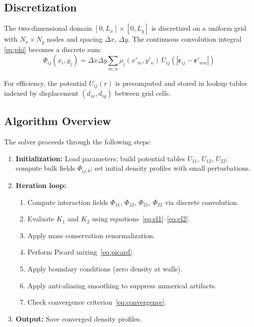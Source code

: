 \documentclass[conference]{IEEEtran}
\begin{document}
\subsection{Discretization}

The two-dimensional domain $[0, L_x] \times [0, L_y]$ is discretized on a uniform grid with $N_x \times N_y$ nodes and spacing $\Delta x$, $\Delta y$. The continuous convolution integral \eqref{eq:phi} becomes a discrete sum:
\begin{equation}
\Phi_{ij}(x_i, y_j) = \Delta x \Delta y \sum_{m,n} \rho_j(x'_m, y'_n) \, U_{ij}(|\mathbf{r}_{ij} - \mathbf{r}'_{mn}|)
\label{eq:discrete_phi}
\end{equation}

For efficiency, the potential $U_{ij}(r)$ is precomputed and stored in lookup tables indexed by displacement $(d_{ix}, d_{iy})$ between grid cells.

\subsection{Algorithm Overview}

The solver proceeds through the following steps:
\begin{enumerate}
    \item \textbf{Initialization:} Load parameters; build potential tables $U_{11}$, $U_{12}$, $U_{22}$; compute bulk fields $\Phi_{ij,b}$; set initial density profiles with small perturbations.
    \item \textbf{Iteration loop:}
    \begin{enumerate}
        \item Compute interaction fields $\Phi_{11}$, $\Phi_{12}$, $\Phi_{21}$, $\Phi_{22}$ via discrete convolution.
        \item Evaluate $K_1$ and $K_2$ using equations~\eqref{eq:el1}--\eqref{eq:el2}.
        \item Apply mass conservation renormalization.
        \item Perform Picard mixing~\eqref{eq:picard}.
        \item Apply boundary conditions (zero density at walls).
        \item Apply anti-aliasing smoothing to suppress numerical artifacts.
        \item Check convergence criterion~\eqref{eq:convergence}.
    \end{enumerate}
    \item \textbf{Output:} Save converged density profiles.
\end{enumerate}
\end{document}
